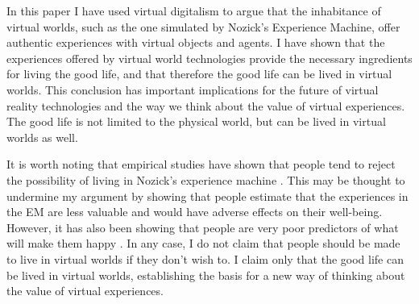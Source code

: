 In this paper I have used virtual digitalism to argue that the inhabitance of
virtual worlds, such as the one simulated by Nozick's Experience Machine, offer
authentic experiences with virtual objects and agents. I have shown that the 
experiences offered by virtual world technologies provide the necessary 
ingredients for living the good life, and that therefore the good life can be
lived in virtual worlds. This conclusion has important implications for the
future of virtual reality technologies and the way we think about the value of
virtual experiences. The good life is not limited to the physical world, but can
be lived in virtual worlds as well.

It is worth noting that empirical studies have shown that people tend to reject
the possibility of living in Nozick's experience machine \citep{Hindriks2018}.
This may be thought to undermine my argument by showing that people estimate
that the experiences in the EM are less valuable and would have adverse effects
on their well-being. However, it has also been showing that people are very poor
predictors of what will make them happy \citep{Gilbert2005}. In any case, 
I do not claim that people should be made to live in virtual worlds if they 
don't wish to. I claim only that the good life can be lived in virtual worlds,
establishing the basis for a new way of thinking about the value of virtual
experiences.

